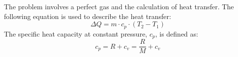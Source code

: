 The problem involves a perfect gas and the calculation of heat transfer. The following equation is used to describe the heat transfer:  
\[
\Delta Q = m \cdot c_p \cdot (T_2 - T_1)
\]  
The specific heat capacity at constant pressure, \( c_p \), is defined as:  
\[
c_p = R + c_v = \frac{R}{M} + c_v
\]